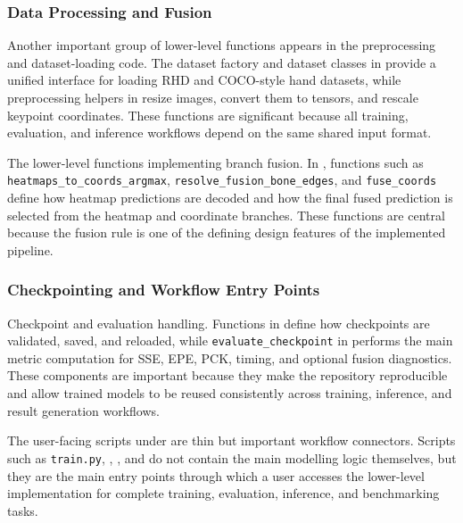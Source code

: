 ﻿\documentclass[11pt,a4paper]{article}
\begin{document}
\subsubsection*{Data Processing and Fusion}

Another important group of lower-level functions appears in the preprocessing
and dataset-loading code. The dataset factory and dataset classes in
 provide a unified interface for loading RHD and
COCO-style hand datasets, while preprocessing helpers in
 resize images, convert them to
tensors, and rescale keypoint coordinates.
These functions are significant because all training, evaluation, and
inference workflows depend on the same shared input format.

\medskip

The lower-level functions implementing branch fusion. 
In , functions such as
\texttt{heatmaps\_to\_coords\_argmax}, \texttt{resolve\_fusion\_bone\_edges},
and \texttt{fuse\_coords} define how heatmap predictions are decoded and how
the final fused prediction is selected from the heatmap and coordinate
branches.
These functions are central because the fusion rule is one of the defining
design features of the implemented pipeline.

\subsubsection*{Checkpointing and Workflow Entry Points}

Checkpoint and evaluation handling. 
Functions in  define how
checkpoints are validated, saved, and reloaded, while
\texttt{evaluate\_checkpoint} in
 performs the main
metric computation for SSE, EPE, PCK, timing, and optional fusion diagnostics.
These components are important because they make the repository reproducible
and allow trained models to be reused consistently across training, inference,
and result generation workflows.

\medskip

The user-facing scripts under  are thin but
important workflow connectors. Scripts such as \texttt{train.py},
, , and
 do not contain the main modelling logic
themselves, but they are the main entry points through which a user accesses
the lower-level implementation for complete training, evaluation, inference,
and benchmarking tasks.
\end{document}
